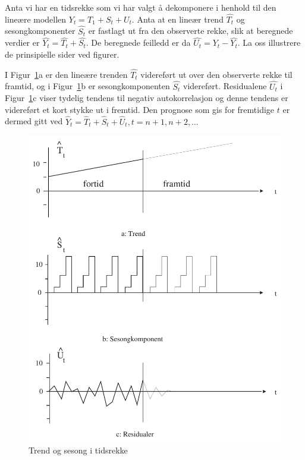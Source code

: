 Anta vi har en tidsrekke som vi har valgt å dekomponere i henhold til
den lineære modellen $Y_t = T_1 + S_t + U_t$.  Anta at en lineær
trend $\hat{T_t}$ og sesongkomponenter $\hat{S_t}$ er fastlagt ut fra den
observerte rekke, slik at beregnede verdier er $\hat{Y_t} = \hat{T_t} +
\hat{S_t}$.  De beregnede feilledd er da $\hat{U_t} = Y_t - \hat{Y_t}$.  La
oss illustrere de prinsipielle sider ved figurer.

I Figur~\ref{fig:trend_sesong}a er den lineære trenden $\hat{T_t}$ videreført ut over den
observerte rekke til framtid, og i Figur~\ref{fig:trend_sesong}b er sesongkomponenten $\hat{S_t}$
videreført.  Resi\-dualene $\hat{U_t}$ i Figur~\ref{fig:trend_sesong}c viser tydelig tendens til
negativ autokorrelasjon og denne tendens er videreført et kort stykke ut
i fremtid.  Den prognose som gis for fremtidige $t$ er dermed gitt ved
${\hat{Y}}_t={\hat{T}}_t+{\hat{S}}_t+{\hat{U}}_t, t=n+1,n+2, \ldots $

\begin{figure}[H]
\centering
   \includegraphics[scale=0.6]{figurer/fig13_5.pdf} 
   \caption{Trend og sesong i tidsrekke}
	\label{fig:trend_sesong}
\end{figure}

